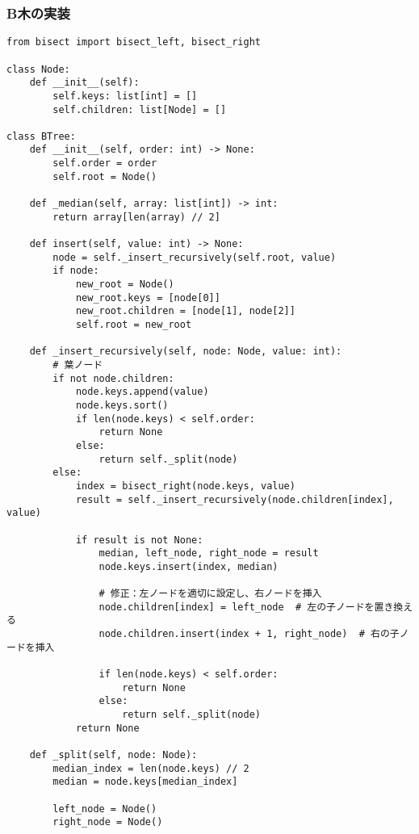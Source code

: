 \documentclass{jlreq}
\begin{document}
\subsubsection{B木の実装}

\begin{lstlisting}[caption=B木の実装, label=btree, frame=TRBL, label={btree}]
from bisect import bisect_left, bisect_right

class Node:
    def __init__(self):
        self.keys: list[int] = []
        self.children: list[Node] = []

class BTree:
    def __init__(self, order: int) -> None:
        self.order = order
        self.root = Node()
    
    def _median(self, array: list[int]) -> int:
        return array[len(array) // 2]

    def insert(self, value: int) -> None:
        node = self._insert_recursively(self.root, value)
        if node:
            new_root = Node()
            new_root.keys = [node[0]]
            new_root.children = [node[1], node[2]]
            self.root = new_root
    
    def _insert_recursively(self, node: Node, value: int):
        # 葉ノード
        if not node.children:
            node.keys.append(value)
            node.keys.sort()
            if len(node.keys) < self.order:
                return None 
            else:
                return self._split(node)
        else:  
            index = bisect_right(node.keys, value)
            result = self._insert_recursively(node.children[index], value)
            
            if result is not None:
                median, left_node, right_node = result
                node.keys.insert(index, median)
                
                # 修正：左ノードを適切に設定し、右ノードを挿入
                node.children[index] = left_node  # 左の子ノードを置き換える
                node.children.insert(index + 1, right_node)  # 右の子ノードを挿入

                if len(node.keys) < self.order:
                    return None
                else:
                    return self._split(node) 
            return None

    def _split(self, node: Node):
        median_index = len(node.keys) // 2
        median = node.keys[median_index]

        left_node = Node()
        right_node = Node()


\end{lstlisting}
\end{document}
